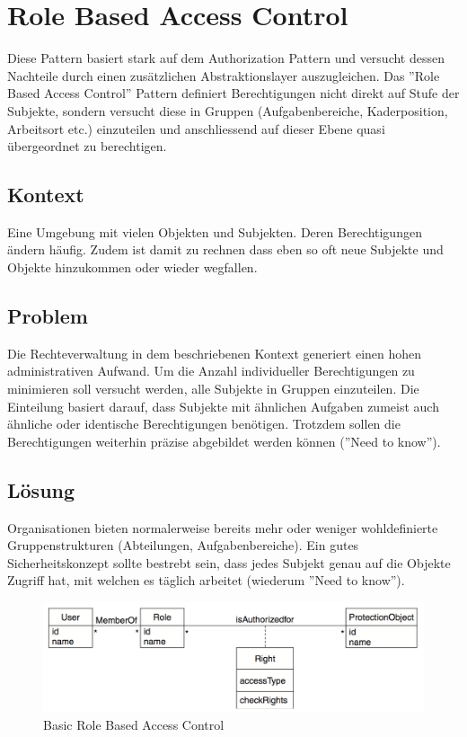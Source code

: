 \section{Role Based Access Control}

Diese Pattern basiert stark auf dem Authorization Pattern und versucht dessen Nachteile durch einen zusätzlichen Abstraktionslayer auszugleichen.
Das ''Role Based Access Control'' Pattern definiert Berechtigungen nicht direkt auf Stufe der Subjekte, sondern versucht diese in Gruppen (Aufgabenbereiche, Kaderposition, Arbeitsort etc.) einzuteilen und anschliessend auf dieser Ebene quasi übergeordnet zu berechtigen.

\subsection*{Kontext}
Eine Umgebung mit vielen Objekten und Subjekten. Deren Berechtigungen ändern häufig. Zudem ist damit zu rechnen dass eben so oft neue Subjekte und Objekte hinzukommen oder wieder wegfallen.

\subsection*{Problem}
Die Rechteverwaltung in dem beschriebenen Kontext generiert einen hohen administrativen Aufwand. Um die Anzahl individueller Berechtigungen zu minimieren soll versucht werden, alle Subjekte in Gruppen einzuteilen. Die Einteilung basiert darauf, dass Subjekte mit ähnlichen Aufgaben zumeist auch ähnliche oder identische Berechtigungen benötigen.
Trotzdem sollen die Berechtigungen weiterhin präzise abgebildet werden können (''Need to know'').

\subsection*{Lösung}
Organisationen bieten normalerweise bereits mehr oder weniger wohldefinierte Gruppenstrukturen (Abteilungen, Aufgabenbereiche).
Ein gutes Sicherheitskonzept sollte bestrebt sein, dass jedes Subjekt genau auf die Objekte Zugriff hat, mit welchen es täglich arbeitet (wiederum ''Need to know'').

\begin{figure}[H]
	\includegraphics[width=\textwidth]{chapter/01/rolebasedaccesscontrol.png}
	\caption{Basic Role Based Access Control}
\end{figure}


